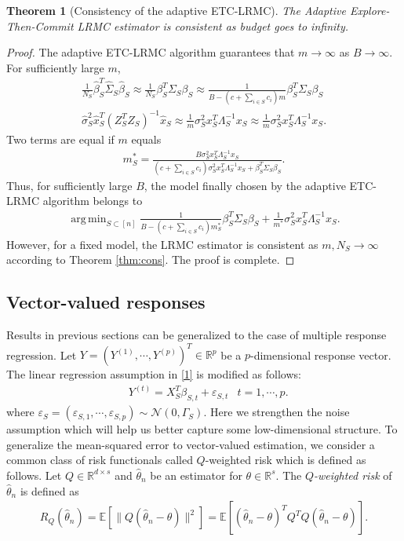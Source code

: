 \documentclass[11pt,a4paper]{amsart}
\numberwithin{equation}{section}
\theoremstyle{plain}
\newtheorem{Th}{Theorem}
\theoremstyle{definition}
\def\R{{\mathbb R}}
\def\E{{\mathbb E}}
\def\R{{\mathbb R}}
\def\e{{\varepsilon}}
\DeclareMathOperator*{\argmin}{arg\,min}
\begin{document}
\begin{Th}[Consistency of the adaptive ETC-LRMC]
The Adaptive Explore-Then-Commit LRMC estimator is consistent as budget goes to infinity. 
\end{Th} 
\begin{proof}
The adaptive ETC-LRMC algorithm guarantees that $m\to\infty$ as $B\to\infty$. For sufficiently large $m$, 
\begin{align*}
 \frac{1}{N_S}\widehat{\beta}_S^T\widehat{\Sigma}_S\widehat{\beta}_S \approx  \frac{1}{N_S}\beta_S^T\Sigma_S\beta_S  \approx \frac{1}{B-(c+\sum_{i\in S}c_i)m}\beta_S^T\Sigma_S\beta_S\\
  \widehat{\sigma}_S^2\widehat{x}_S^T(Z_S^TZ_S)^{-1}\widehat{x}_S\approx \frac{1}{m}\sigma_S^2x_S^T\Lambda_S^{-1}x_S \approx \frac{1}{m}\sigma_S^2x_S^T\Lambda_S^{-1}x_S.
\end{align*}
Two terms are equal if $m$ equals 
\begin{align*}
m_S^* = \frac{B\sigma_S^2x_S^T\Lambda_S^{-1}x_S}{(c+\sum_{i\in S}c_i)\sigma_S^2x_S^T\Lambda_S^{-1}x_S+\beta_S^T\Sigma_S\beta_S}.
\end{align*}
Thus, for sufficiently large $B$, the model finally chosen by the adaptive ETC-LRMC algorithm belongs to
\begin{align*}
\argmin_{S\subset [n]}\frac{1}{B-(c+\sum_{i\in S}c_i)m_S^*}\beta_S^T\Sigma_S\beta_S+ \frac{1}{m^*}\sigma_S^2x_S^T\Lambda_S^{-1}x_S.
\end{align*}
However, for a fixed model, the LRMC estimator is consistent as $m, N_S\to\infty$ according to Theorem \ref{thm:cons}. The proof is complete.  
\end{proof}


\subsection{Vector-valued responses}

Results in previous sections can be generalized to the case of multiple response regression.
Let $Y = (Y^{(1)}, \cdots, Y^{(p)})^T\in\R^p$ be a $p$-dimensional response vector.
The linear regression assumption in \eqref{1} is modified as follows:
\begin{align}
&Y^{(t)} = X_S^T\beta_{S, t} + \e_{S, t}& t = 1, \cdots, p. \label{newass}
\end{align}
where $\e_S = (\e_{S, 1}, \cdots, \e_{S, p})\sim\mathcal N (0, \Gamma_S)$. 
Here we strengthen the noise assumption which will help us better capture some low-dimensional structure. 
To generalize the mean-squared error to vector-valued estimation, we consider a common class of risk functionals called $Q$-weighted risk which is defined as follows. 
Let $Q\in\R^{d\times s}$ and $\widehat{\theta}_n$ be an estimator for $\theta\in\R^s$. 
The \emph{$Q$-weighted risk} of $\widehat{\theta}_n$ is defined as 
\begin{align}
R_Q(\widehat{\theta}_n) = \E\left[\|Q(\widehat{\theta}_n-\theta)\|^2\right] = \E\left[(\widehat{\theta}_n-\theta)^TQ^TQ(\widehat{\theta}_n-\theta)\right].
\end{align}
\end{document}
